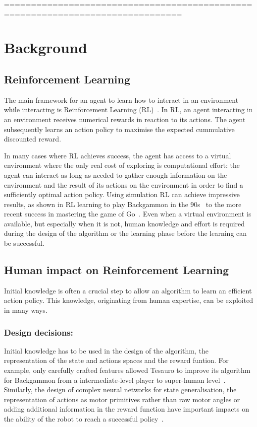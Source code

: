 \documentclass[letterpaper]{article} %
\begin{document}
===============================================================================

\section{Background}
\subsection{Reinforcement Learning}

The main framework for an agent to learn how to interact in an environment while
interacting is Reinforcement Learning
(RL)~\cite{kober2013reinforcement,sutton1998reinforcement}. In RL, an agent
interacting in an environment receives numerical rewards in reaction to its
actions. The agent subsequently learns an action policy to maximise the expected
cummulative discounted reward.

In many cases where RL achieves success, the agent has access to a virtual
environment where the only real cost of exploring is computational effort: the
agent can interact as long as needed to gather enough information on the
environment and the result of its actions on the environment in order to find a
sufficiently optimal action policy. Using simulation RL can achieve impressive
results, as shown in RL learning to play Backgammon in the
90s~\cite{tesauro1995temporal} to the more recent success in mastering the game
of Go~\cite{silver2016mastering}. Even when a virtual environment is available,
but especially when it is not, human knowledge and effort is required during the
design of the algorithm or the learning phase before the learning can be
successful.

\subsection{Human impact on Reinforcement Learning}

Initial knowledge is often a crucial step to allow an algorithm to learn an
efficient action policy. This knowledge, originating from human expertise, can
be exploited in many ways. 

\subsubsection{Design decisions:}
Initial knowledge has to be used in the design of the algorithm, the
representation of the state and actions spaces and the reward funtion. For
example, only carefully crafted features allowed
Tesauro to improve its algorithm for Backgammon from a intermediate-level player
to super-human level~\cite{tesauro1995temporal}. Similarly, the design of
complex neural networks for state generalisation, the representation of actions
as motor primitives rather than raw motor angles or adding additional
information in the reward function have important impacts on the ability of
the robot to reach a successful policy~\cite{kober2013reinforcement}.
\end{document}

